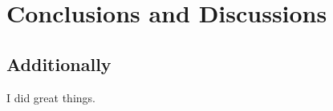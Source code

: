 \chapter{Conclusions and Discussions}
\label{chapt:conc}



\section{Additionally}

I did great things.
